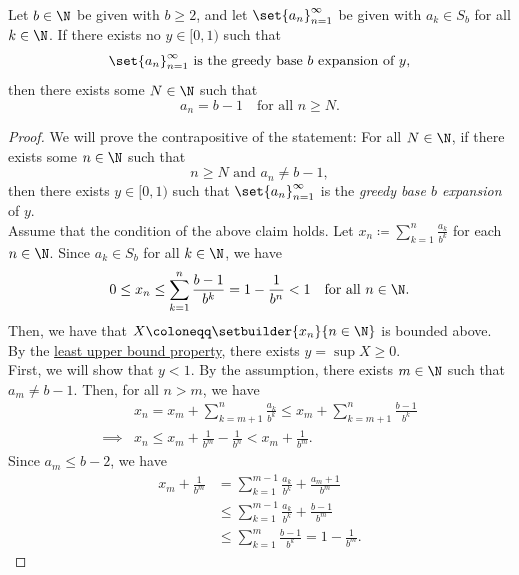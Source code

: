 \bigskip

\begin{theorem} \label{thm:NoRealNumberMatchingGreedyBaseExpansion}
    Let $b \in \N$ be given with $b \geq 2$, and let $\set{a_{n}}_{n = 1}^{\infty}$ be given with $a_{k} \in S_{b}$
    for all $k \in \N$. If there exists no $y \in [0, 1)$ such that
    \[
    \set{a_{n}}_{n = 1}^{\infty} \text{ is the greedy base $b$ expansion of $y$},
    \]
    then there exists some $N \in \N$ such that
    \[
    a_{n} = b - 1 \quad \text{for all } n \geq N.
    \]
\end{theorem}

\begin{proof}
    We will prove the contrapositive of the statement: For all $N \in \N$, if there exists some $n \in \N$ such that
    \[
    n \geq N \text{ and } a_{n} \neq b - 1,
    \]
    then there exists $y \in [0, 1)$ such that $\set{a_{n}}_{n = 1}^{\infty}$ is the \emph{greedy base $b$ expansion} of $y$.
    \\[6mm]
    Assume that the condition of the above claim holds. Let $x_{n} \coloneqq \displaystyle \sum_{k = 1}^{n}
    \frac{a_{k}}{b^{k}}$ for each $n \in \N$. Since $a_{k} \in S_{b}$ for all $k \in \N$, we have
    \[
    0 \leq x_{n} \leq \sum_{k = 1}^{n} \frac{b - 1}{b^{k}} = 1 - \frac{1}{b^{n}} < 1 \quad \text{for all } n \in \N.
    \]
    Then, we have that $X \coloneqq \setbuilder{x_{n}}{n \in \N}$ is bounded above. By the
    \hyperref[def:LeastUpperBoundProperty]{least upper bound property}, there exists $y = \sup X \geq 0$.
    \\[6mm]
    First, we will show that $y < 1$. By the assumption, there exists $m \in \N$ such that $a_{m} \neq b - 1$.
    Then, for all $n > m$, we have
    \begin{align*}
        &x_{n} = x_{m} + \sum_{k = m + 1}^{n} \frac{a_{k}}{b^{k}} \leq x_{m} + \sum_{k = m + 1}^{n} \frac{b - 1}{b^{k}} \\
        \implies &x_{n} \leq x_{m} + \frac{1}{b^{m}} - \frac{1}{b^{n}} < x_{m} + \frac{1}{b^{m}}.
    \end{align*}
    Since $a_{m} \leq b - 2$, we have
    \begin{align*}
        x_{m} + \frac{1}{b^{m}} &= \sum_{k = 1}^{m - 1} \frac{a_{k}}{b^{k}} + \frac{a_{m} + 1}{b^{m}} \\
        &\leq \sum_{k = 1}^{m - 1} \frac{a_{k}}{b^{k}} + \frac{b - 1}{b^{m}} \\
        &\leq \sum_{k = 1}^{m} \frac{b - 1}{b^{k}} = 1 - \frac{1}{b^{m}}.
    \end{align*}

\end{proof}
